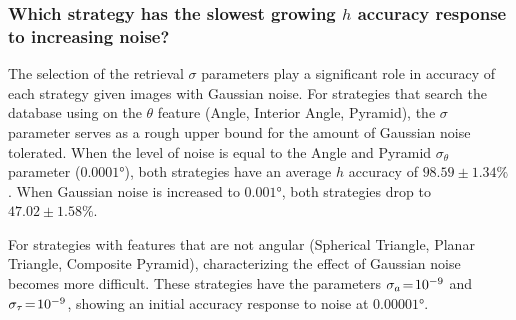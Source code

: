 \subsubsection{Which strategy has the slowest growing $h$ accuracy response to increasing noise?}
The selection of the retrieval $\sigma$ parameters play a significant role in accuracy of each strategy given images
with Gaussian noise.
For strategies that search the database using on the $\theta$ feature (Angle, Interior Angle, Pyramid), the $\sigma$
parameter serves as a rough upper bound for the amount of Gaussian noise tolerated.
When the level of noise is equal to the Angle and Pyramid $\sigma_\theta$ parameter ($\ang{0.0001}$),
both strategies have an average $h$ accuracy of $98.59\!\pm\!1.34\%$.
When Gaussian noise is increased to $\ang{0.001}$, both strategies drop to $47.02\!\pm\!1.58\%$.

For strategies with features that are not angular (Spherical Triangle, Planar Triangle, Composite Pyramid),
characterizing the effect of Gaussian noise becomes more difficult.
These strategies have the parameters $\sigma_a \!=\! 10^{-9}$ and $\sigma_\tau \!=\! 10^{-9}$, showing an initial
accuracy response to noise at $\ang{0.00001}$.

